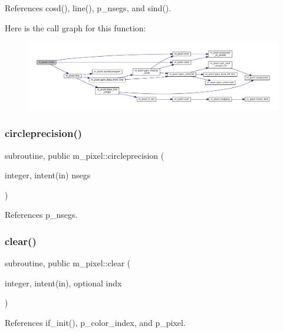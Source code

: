 References cosd(), line(), p\+\_\+nsegs, and sind().

Here is the call graph for this function\+:
\nopagebreak
\begin{figure}[H]
\begin{center}
\leavevmode
\includegraphics[width=350pt]{namespacem__pixel_ab3b12cc498ed490014aa5fcc0bb278d2_cgraph}
\end{center}
\end{figure}
\mbox{\label{namespacem__pixel_a68ca1be8f7a92ece6efce8d69987af9c}} 
\subsubsection{\texorpdfstring{circleprecision()}{circleprecision()}}
{\footnotesize\ttfamily subroutine, public m\+\_\+pixel\+::circleprecision (\begin{DoxyParamCaption}\item[{integer, intent(in)}]{nsegs }\end{DoxyParamCaption})}



References p\+\_\+nsegs.

\mbox{\label{namespacem__pixel_af3b81a21a0b2f6b5eddd09c031bd6173}} 
\subsubsection{\texorpdfstring{clear()}{clear()}}
{\footnotesize\ttfamily subroutine, public m\+\_\+pixel\+::clear (\begin{DoxyParamCaption}\item[{integer, intent(in), optional}]{indx }\end{DoxyParamCaption})}



References if\+\_\+init(), p\+\_\+color\+\_\+index, and p\+\_\+pixel.


